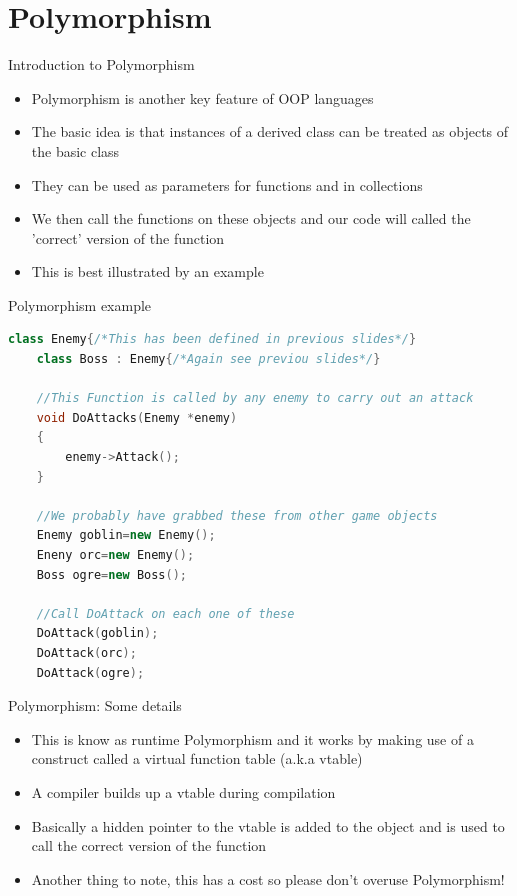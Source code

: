 \part{Polymorphism}
\frame{\partpage}

\begin{frame}{Introduction to Polymorphism}
	\begin{itemize}
		\pause \item Polymorphism is another key feature of OOP languages
		\pause \item The basic idea is that instances of a derived class can be treated as objects of the basic class
		\pause \item They can be used as parameters for functions and in collections
		\pause \item We then call the functions on these objects and our code will called the 'correct' version of the function
		\pause \item This is best illustrated by an example 
	\end{itemize}
\end{frame}


\begin{frame}[fragile]{Polymorphism example}
	\begin{lstlisting}[language=C++,basicstyle=\tiny,]
	class Enemy{/*This has been defined in previous slides*/}
	class Boss : Enemy{/*Again see previou slides*/}
	
	//This Function is called by any enemy to carry out an attack
	void DoAttacks(Enemy *enemy)
	{
		enemy->Attack();
	}
	
	//We probably have grabbed these from other game objects
	Enemy goblin=new Enemy();
	Eneny orc=new Enemy();
	Boss ogre=new Boss();
	
	//Call DoAttack on each one of these
	DoAttack(goblin);
	DoAttack(orc);
	DoAttack(ogre);
	\end{lstlisting}
\end{frame}

\begin{frame}{Polymorphism: Some details}
	\begin{itemize}
		\pause \item This is know as runtime Polymorphism and it works by making use of a construct called a virtual function table (a.k.a vtable)
		\pause \item A compiler builds up a vtable during compilation
		\pause \item Basically a hidden pointer to the vtable is added to the object and is used to call the correct version of the function
		\pause \item Another thing to note, this has a cost so please don't overuse Polymorphism!  
	\end{itemize}
\end{frame}

